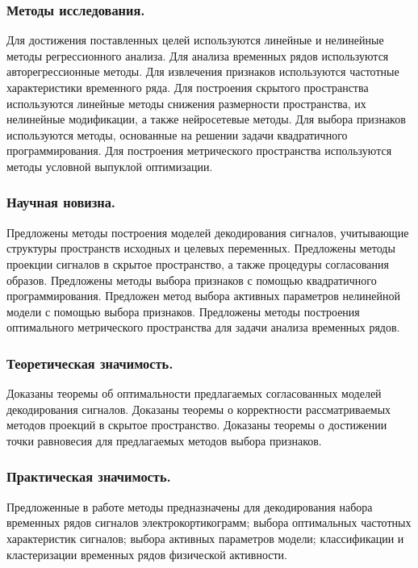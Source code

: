 \subsubsection{Методы исследования.}
Для достижения поставленных целей используются линейные и нелинейные методы регрессионного анализа.
Для анализа временных рядов используются авторегрессионные методы.
Для извлечения признаков используются частотные характеристики временного ряда.
Для построения скрытого пространства используются линейные методы снижения размерности пространства, их нелинейные модификации, а также нейросетевые методы.
Для выбора признаков используются методы, основанные на решении задачи квадратичного программирования.
Для построения метрического пространства используются методы условной выпуклой оптимизации.

\subsubsection{Научная новизна.}
Предложены методы построения моделей декодирования сигналов, учитывающие структуры пространств исходных и целевых переменных.
Предложены методы проекции сигналов в скрытое пространство, а также процедуры согласования образов.
Предложены методы выбора признаков с помощью квадратичного программирования.
Предложен метод выбора активных параметров нелинейной модели с помощью выбора признаков.
Предложены методы построения оптимального метрического пространства для задачи анализа временных рядов.

\subsubsection{Теоретическая значимость.}
Доказаны теоремы об оптимальности предлагаемых согласованных моделей декодирования сигналов.
Доказаны теоремы о корректности рассматриваемых методов проекций в скрытое пространство.
Доказаны теоремы о достижении точки равновесия для предлагаемых методов выбора признаков. 

\subsubsection{Практическая значимость.}
Предложенные в работе методы предназначены для декодирования набора временных рядов сигналов электрокортикограмм; выбора оптимальных частотных характеристик сигналов; выбора активных параметров модели; классификации и кластеризации временных рядов физической активности.

